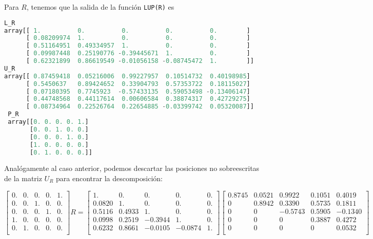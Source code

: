 \documentclass{article}
\begin{document}
\begin{enumerate}
    Para $R$, tenemos que la salida de la función \texttt{LUP(R)} es

\begin{lstlisting}[language=Python]
L_R 
array[[ 1.          0.          0.          0.          0.        ]
      [ 0.08209974  1.          0.          0.          0.        ]
      [ 0.51164951  0.49334957  1.          0.          0.        ]
      [ 0.09987448  0.25190776 -0.39445671  1.          0.        ]
      [ 0.62321899  0.86619549 -0.01056158 -0.08745472  1.        ]]
U_R
array[[ 0.87459418  0.05216006  0.99227957  0.10514732  0.40198985]
      [ 0.5450637   0.89424652  0.33904793  0.57353722  0.18115027]
      [ 0.07180395  0.7745923  -0.57433135  0.59053498 -0.13406147]
      [ 0.44748568  0.44117614  0.00606584  0.38874317  0.42729275]
      [ 0.08734964  0.22526764  0.22654885 -0.03399742  0.05320087]]
 P_R
 array[[0. 0. 0. 0. 1.]
       [0. 0. 1. 0. 0.]
       [0. 0. 0. 1. 0.]
       [1. 0. 0. 0. 0.]
       [0. 1. 0. 0. 0.]]
\end{lstlisting}

Analógamente al caso anterior, podemos descartar las posiciones no sobreescritas de la matriz
$U_R$ para encontrar la descomposición:

    \begin{equation*}
        \begin{bmatrix}
            0. & 0. & 0. & 0. & 1.\\
            0. & 0. & 1. & 0. & 0.\\
            0. & 0. & 0. & 1. & 0.\\
            1. & 0. & 0. & 0. & 0.\\
            0. & 1. & 0. & 0. & 0.\\
          \end{bmatrix} R = \begin{bmatrix}
            1. & 0. & 0. & 0. & 0.\\
            0.0820 & 1. & 0. & 0. & 0.\\
            0.5116 & 0.4933 & 1. & 0. & 0.\\
            0.0998 & 0.2519 & -0.3944 & 1. & 0.\\
            0.6232 & 0.8661 & -0.0105 & -0.0874 & 1.\\
          \end{bmatrix} \begin{bmatrix}
            0.8745 & 0.0521 & 0.9922 & 0.1051 & 0.4019\\
            0 & 0.8942 & 0.3390 & 0.5735 & 0.1811\\
            0 & 0 & -0.5743 & 0.5905 & -0.1340\\
            0 & 0 & 0 & 0.3887 & 0.4272\\
            0 & 0 & 0 & 0 & 0.0532\\
          \end{bmatrix}
    \end{equation*}



\end{enumerate}
\end{document}
